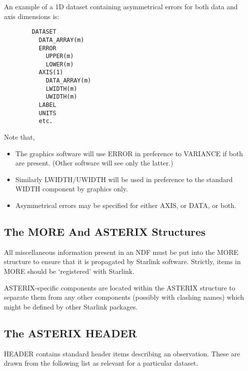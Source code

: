An example of a 1D dataset containing  asymmetrical  errors  for  both
data and axis dimensions is:

\begin{verbatim}
        DATASET
          DATA_ARRAY(m)
          ERROR
            UPPER(m)
            LOWER(m)
          AXIS(1)
            DATA_ARRAY(m)
            LWIDTH(m)
            UWIDTH(m)
          LABEL
          UNITS
          etc.
\end{verbatim}

Note that,

\begin{itemize}
\item
The graphics software will use ERROR in preference to VARIANCE 
if both are present. (Other software will see only the latter.)

\item
Similarly LWIDTH/UWIDTH will be used in preference to the
standard WIDTH component by graphics only.

\item
Asymmetrical errors may be specified for either AXIS, or DATA,
or both.
\end{itemize}

\subsection{The MORE And ASTERIX Structures}

All miscellaneous information present in an NDF must be put  into  the
MORE  structure  to ensure that it is propagated by Starlink software.
Strictly, items in MORE should be `registered' with Starlink.

ASTERIX-specific components are located within the  ASTERIX  structure
to  separate  them  from  any other components (possibly with clashing
names) which might be defined by other Starlink packages.

\subsection{The ASTERIX HEADER}

HEADER contains  standard  header  items  describing  an  observation.
These  are  drawn from the following list as relevant for a particular
dataset.

